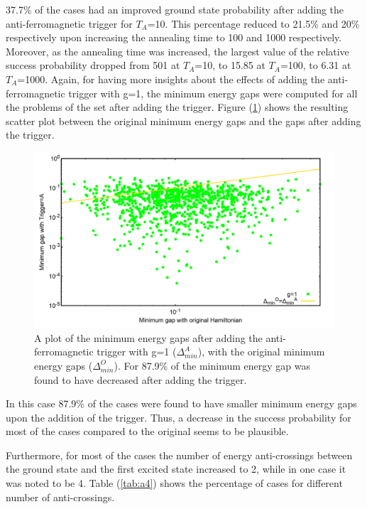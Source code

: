 \documentclass[12]{article}
\begin{document}
37.7\% of the cases had an improved ground state probability after adding the anti-ferromagnetic trigger for $T_A$=10. This percentage reduced to 21.5\% and 20\% respectively upon increasing the annealing time to 100 and 1000 respectively. Moreover, as the annealing time was increased, the largest value of the relative success probability dropped from 501 at $T_A$=10, to 15.85 at $T_A$=100, to 6.31 at $T_A$=1000. Again, for having more insights about the effects of adding the anti-ferromagnetic trigger with g=1, the minimum energy gaps were computed for all the problems of the set after adding the trigger. Figure (\ref{fig:a21}) shows the resulting scatter plot between the original minimum energy gaps and the gaps after adding the trigger.

\begin{figure}[H]
\centering 
\includegraphics[scale=0.24]{MinGap_A_g1.png}
\caption{A plot of the minimum energy gaps after adding the anti-ferromagnetic trigger with g=1 ($\Delta_{min}^A$), with the original minimum energy gaps ($\Delta_{min}^O$). For 87.9\% of the minimum energy gap was found to have decreased after adding the trigger.}
\label{fig:a21}
\end{figure}
In this case 87.9\% of the cases were found to have smaller minimum energy gaps upon the addition of the trigger. Thus, a decrease in the success probability for most of the cases compared to the original seems to be plausible.

Furthermore, for most of the cases the number of  energy anti-crossings between the ground state and the first excited state increased to 2, while in one case it was noted to be 4. Table (\ref{tab:a4}) shows the percentage of cases for different number of anti-crossings.
\end{document}
